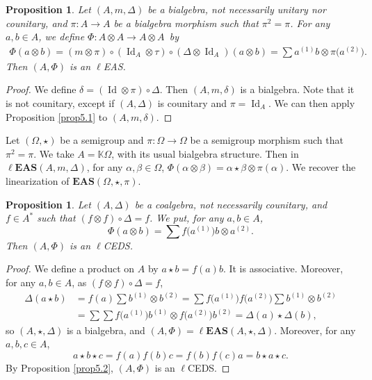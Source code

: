 \documentclass[pdftex]{sigma}
\numberwithin{equation}{section}
\newtheorem{Proposition}[Theorem]{Proposition}
 { \theoremstyle{definition}
\newtheorem{Definition}[Theorem]{Definition}
\newtheorem{Note}[Theorem]{Note}
\newtheorem{Example}[Theorem]{Example}
\newtheorem{Remark}[Theorem]{Remark}
\newtheorem{Notation}[Theorem]{Notation}}
\newcommand{\eas}{\mathbf{EAS}}
\newcommand{\leas}{\ell\mathbf{EAS}}
\begin{document}
\begin{Proposition}
Let $(A,m,\Delta)$ be a bialgebra, not necessarily unitary nor counitary, and $\pi\colon A\longrightarrow A$ be a bialgebra morphism such that $\pi^2=\pi$. For any $a,b\in A$, we define $\Phi\colon A\otimes A\longrightarrow A\otimes A$~by
\begin{align*}
\Phi(a\otimes b)=(m\otimes \pi)\circ (\operatorname{Id}_A\otimes \tau)\circ (\Delta\otimes \operatorname{Id}_A)(a\otimes b)=\sum a^{(1)}b\otimes \pi\bigl(a^{(2)}\bigr).
\end{align*}
 Then $(A,\Phi)$ is an $\ell$EAS.
\end{Proposition}

\begin{proof}
We define $\delta=(\operatorname{Id} \otimes \pi)\circ \Delta$. Then $(A,m,\delta)$ is a bialgebra. Note that it is not counitary, except if $(A,\Delta)$ is counitary and $\pi=\operatorname{Id}_A$. We can then apply Proposition \ref{prop5.1} to $(A,m,\delta)$.
\end{proof}

\begin{Example}
Let $(\Omega,\star)$ be a semigroup and $\pi\colon\Omega\longrightarrow \Omega$ be a semigroup morphism such that~${\pi^2=\pi}$. We take $A=\mathbb{K}\Omega$, with its usual bialgebra structure. Then in $\leas(A,m,\Delta)$, for any $\alpha,\beta \in \Omega$,
$\Phi(\alpha \otimes \beta)=\alpha\star \beta \otimes \pi(\alpha)$.
We recover the linearization of $\eas(\Omega,\star,\pi)$.
\end{Example}

\begin{Proposition}
Let $(A,\Delta)$ be a coalgebra, not necessarily counitary, and $f\in A^*$ such that $(f\otimes f)\circ \Delta=f$. We put, for any $a,b\in A$,
\[\Phi(a\otimes b)=\sum f\bigl(a^{(1)}\bigr)b\otimes a^{(2)}.\]
Then $(A,\Phi)$ is an $\ell$CEDS.
\end{Proposition}

\begin{proof}
We define a product on $A$ by $a\star b=f(a)b$. It is associative. Moreover, for any $a,b\in A$, as $(f\otimes f)\circ \Delta=f$,
\begin{align*}
\Delta(a\star b)&=f(a)\sum b^{(1)}\otimes b^{(2)}=\sum f\bigl(a^{(1)}\bigr)f\bigl(a^{(2)}\bigr)\sum b^{(1)}\otimes b^{(2)}\\
&=\sum\sum f\bigl(a^{(1)}\bigr)b^{(1)}\otimes f\bigl(a^{(2)}\bigr)b^{(2)}=\Delta(a)\star \Delta(b),
\end{align*}
so $(A,\star,\Delta)$ is a bialgebra, and $(A,\Phi)=\leas(A,\star,\Delta)$. Moreover, for any $a,b,c\in A$,
\[a\star b\star c=f(a)f(b)c=f(b)f(c)a=b\star a\star c.\]
By Proposition \ref{prop5.2}, $(A,\Phi)$ is an $\ell$CEDS. \end{proof}
\end{document}
